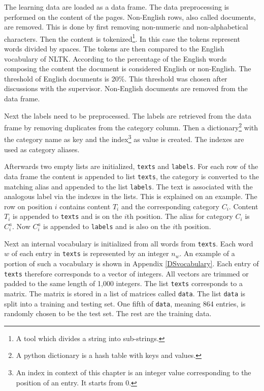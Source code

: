 The learning data are loaded as a data frame. The data preprocessing is performed on the content of the pages. Non-English rows, also called documents, are removed. This is done by first removing non-numeric and non-alphabetical characters. Then the content is tokenized\footnote{A tool which divides a string into sub-strings.}. In this case the tokens represent words divided by spaces. The tokens are then compared to the English vocabulary of NLTK. According to the percentage of the English words composing the content the document is considered English or non-English. The threshold of English documents is 20\%. This threshold was chosen after discussions with the supervisor. Non-English documents are removed from the data frame.

Next the labels need to be preprocessed. The labels are retrieved from the data frame by removing duplicates from the category column. Then a dictionary\footnote{A python dictionary is a hash table with keys and values.} with the category name as key and the index\footnote{An index in context of this chapter is an integer value corresponding to the position of an entry. It starts from 0.} as value is created. The indexes are used as category aliases. 

Afterwards two empty lists are initialized, \texttt{texts} and \texttt{labels}. For each row of the data frame the content is appended to list \texttt{texts}, the category is converted to the matching alias and appended to the list \texttt{labels}. The text is associated with the analogous label via the indexes in the lists.  This is explained on an example. The row on position $i$ contains content $T_i$ and the corresponding category $C_i$. Content $T_i$ is appended to \texttt{texts} and is on the $i$th position. The alias for category $C_i$ is $C^a_i$. Now $C^a_i$ is appended to \texttt{labels} and is also on the $i$th position.

Next an internal vocabulary is initialized from all words from \texttt{texts}. Each word $w$ of each entry in \texttt{texts} is represented by an integer $n_w$. An example of a portion of such a vocabulary is shown in Appendix \ref{DSvocabulary}. Each entry of \texttt{texts} therefore corresponds to a vector of integers. All vectors are trimmed or padded to the same length of 1,000 integers. The list \texttt{texts} corresponds to a matrix. The matrix is stored in a list of matrices called \texttt{data}. The list \texttt{data} is split into a training and testing set. One fifth of \texttt{data}, meaning 864 entries, is randomly chosen to be the test set. The rest are the training data.

